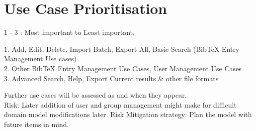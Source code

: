 \section*{Use Case Prioritisation}

1 - 3 : Most important to Least important.

1. Add, Edit, Delete, Import Batch, Export All, Basic Search (BibTeX Entry Management Use cases) \\
2. Other BibTeX Entry Management Use Cases, User Management Use Cases \\
3. Advanced Search, Help, Export Current results \& other file formats

Further use cases will be assessed as and when they appear. \\


Risk: Later addition of user and group management might make for difficult domain model modifications later.
Risk Mitigation strategy: Plan the model with future items in mind.

